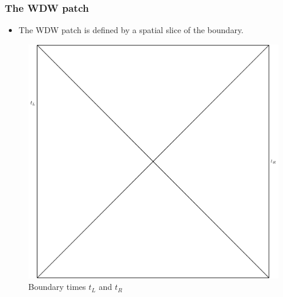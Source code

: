 \documentclass[8pt,aspectratio=169]{beamer}
\begin{document}
\begin{frame}
\frametitle{The WDW patch}

\begin{minipage}[t]{0.55\linewidth}

\begin{itemize}

\item The WDW patch is defined by a spatial slice of the boundary. 

\end{itemize}

\end{minipage}\hfill
%
\begin{minipage}[t]{0.44\linewidth}

\begin{figure}
    \begin{center}
    
        \includegraphics[scale=0.4]{WDW0.pdf}    
    
    \end{center}
    \caption{Boundary times $t_L$ and $t_R$}
    \label{fig:WDW}
\end{figure}

\end{minipage}

\end{frame}
\end{document}
